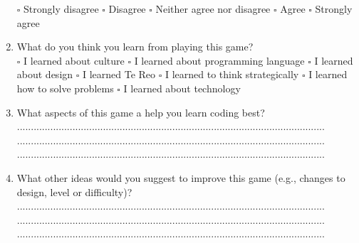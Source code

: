 \documentclass[12pt]{article}\pagestyle{myheadings}
\theoremstyle{plain}
\begin{document}
\begin{enumerate}
$\square$ Strongly disagree $\square$ Disagree $\square$ Neither agree nor disagree $\square$ Agree $\square$ Strongly agree


\item What do you think you learn from playing this game? \\
$\square$  I learned about culture $\square$  I learned about programming language $\square$ I learned about design $\square$ I learned Te Reo $\square$ I learned to think strategically $\square$ I learned how to solve problems $\square$ I learned about technology

\item What aspects of this game a help you learn coding best?\\

...............................................................................................................\\
...............................................................................................................\\
...............................................................................................................\\


\item What other ideas would you suggest to improve this game (e.g., changes to design, level or difficulty)?\\
...............................................................................................................\\
...............................................................................................................\\
...............................................................................................................\\


\end{enumerate}
\end{document}

